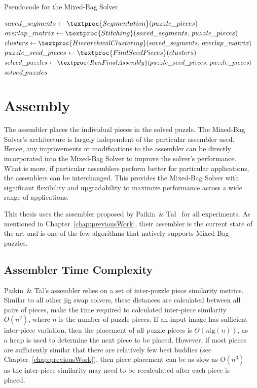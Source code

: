 \begin{algorithm}[tb]
\caption{Pseudocode for the Mixed-Bag Solver}\label{alg:mixedBagSolver}
\begin{algorithmic}[1]
    \State $saved\_segments \gets \textproc{Segmentation}\text{(} puzzle\_pieces \text{)}$
	\State $overlap\_matrix \gets \textproc{Stitching}\text{(} saved\_segments \text{, } puzzle\_pieces \text{)}$
	\State $clusters \gets \textproc{HierarchicalClustering} \text{(}saved\_segments \text{, } overlap\_matrix \text{)}$
	\State $puzzle\_seed\_pieces \gets \textproc{FindSeedPieces} \text{(} clusters \text{)}$
	\State $solved\_puzzles \gets \textproc{RunFinalAssembly} \text{(} puzzle\_seed\_pieces \text{, } puzzle\_pieces \text{)}$
    \State \Return $solved\_puzzles$
\EndFunction
\end{algorithmic}
\end{algorithm}

\section{Assembly}\label{sec:SolverAssembler}

The assembler places the individual pieces in the solved puzzle.  The Mixed-Bag Solver's architecture is largely independent of the particular assembler used.  Hence, any improvements or modifications to the assembler can be directly incorporated into the Mixed-Bag Solver to improve the solver's performance.  What is more, if particular assemblers perform better for particular applications, the assemblers can be interchanged.  This provides the Mixed-Bag Solver with significant flexibility and upgradability to maximize performance across a wide range of applications.

This thesis uses the assembler proposed by Paikin~\& Tal~\cite{paikin2015} for all experiments.  As mentioned in Chapter~\ref{chap:previousWork}, their assembler is the current state of the art and is one of the few algorithms that natively supports Mixed-Bag puzzles.

\subsection{Assembler Time Complexity}\label{sec:assemblerTimeComplexity}

Paikin~\& Tal's assembler relies on a set of inter-puzzle piece similarity metrics.  Similar to all other jig swap solvers, these distances are calculated between all pairs of pieces, make the time required to calculated inter-piece similarity $O(n^2)$, where $n$ is the number of puzzle pieces.  If an input image has sufficient inter-piece variation, then the placement of all puzzle pieces is $\Theta(n \text{lg}(n))$, as a heap is used to determine the next piece to be placed.  However, if most pieces are sufficiently similar that there are relatively few best buddies (see Chapter~\ref{chap:previousWork}), then piece placement can be as slow as $O(n^3)$ as the inter-piece similarity may need to be recalculated after each piece is placed.

